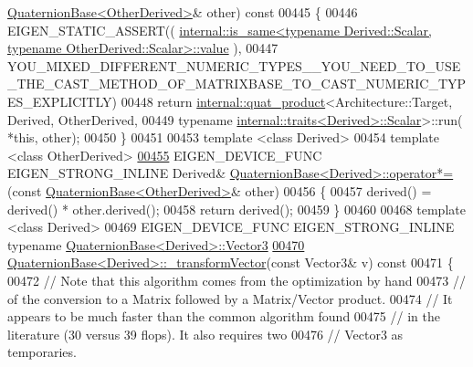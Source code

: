 \begin{DoxyCode}
      \hyperlink{group___geometry___module_class_eigen_1_1_quaternion_base}{QuaternionBase<OtherDerived>}& other)\textcolor{keyword}{ const}
00445 \textcolor{keyword}{}\{
00446   EIGEN\_STATIC\_ASSERT((
      \hyperlink{struct_eigen_1_1internal_1_1is__same}{internal::is\_same<typename Derived::Scalar, typename OtherDerived::Scalar>::value}
      ),
00447    
      YOU\_MIXED\_DIFFERENT\_NUMERIC\_TYPES\_\_YOU\_NEED\_TO\_USE\_THE\_CAST\_METHOD\_OF\_MATRIXBASE\_TO\_CAST\_NUMERIC\_TYPES\_EXPLICITLY)
00448   \textcolor{keywordflow}{return} \hyperlink{struct_eigen_1_1internal_1_1quat__product}{internal::quat\_product}<Architecture::Target, Derived, OtherDerived,
00449                          \textcolor{keyword}{typename} \hyperlink{struct_eigen_1_1internal_1_1traits}{internal::traits<Derived>::Scalar}>::run(
      *\textcolor{keyword}{this}, other);
00450 \}
00451 
00453 \textcolor{keyword}{template} <\textcolor{keyword}{class} Derived>
00454 \textcolor{keyword}{template} <\textcolor{keyword}{class} OtherDerived>
\hyperlink{group___geometry___module_ad5fb3b0792f02b2863f4dc3c3c70ea2d}{00455} EIGEN\_DEVICE\_FUNC EIGEN\_STRONG\_INLINE Derived& 
      \hyperlink{group___geometry___module_ad5fb3b0792f02b2863f4dc3c3c70ea2d}{QuaternionBase<Derived>::operator*= }(\textcolor{keyword}{const} 
      \hyperlink{group___geometry___module_class_eigen_1_1_quaternion_base}{QuaternionBase<OtherDerived>}& other)
00456 \{
00457   derived() = derived() * other.derived();
00458   \textcolor{keywordflow}{return} derived();
00459 \}
00460 
00468 \textcolor{keyword}{template} <\textcolor{keyword}{class} Derived>
00469 EIGEN\_DEVICE\_FUNC EIGEN\_STRONG\_INLINE \textcolor{keyword}{typename} \hyperlink{group___core___module}{QuaternionBase<Derived>::Vector3}
\hyperlink{group___geometry___module_a03896e1e743aae2c18a0146086cef983}{00470} \hyperlink{group___geometry___module_a03896e1e743aae2c18a0146086cef983}{QuaternionBase<Derived>::\_transformVector}(\textcolor{keyword}{const} Vector3& v)\textcolor{keyword}{ const}
00471 \textcolor{keyword}{}\{
00472     \textcolor{comment}{// Note that this algorithm comes from the optimization by hand}
00473     \textcolor{comment}{// of the conversion to a Matrix followed by a Matrix/Vector product.}
00474     \textcolor{comment}{// It appears to be much faster than the common algorithm found}
00475     \textcolor{comment}{// in the literature (30 versus 39 flops). It also requires two}
00476     \textcolor{comment}{// Vector3 as temporaries.}

\end{DoxyCode}

